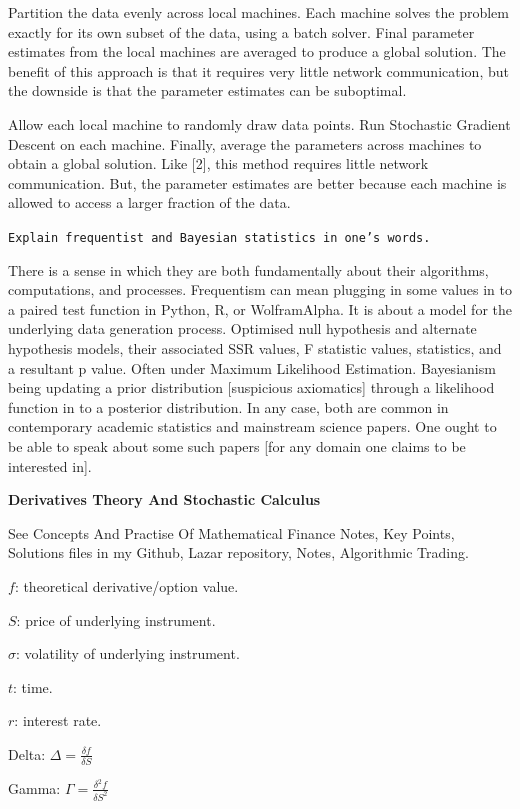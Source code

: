 Partition the data evenly across local machines. Each machine solves the problem exactly for its own subset of the data, using a batch solver. Final parameter estimates from the local machines are averaged to produce a global solution. The benefit of this approach is that it requires very little network communication, but the downside is that the parameter estimates can be suboptimal.

Allow each local machine to randomly draw data points. Run Stochastic Gradient Descent on each machine. Finally, average the parameters across machines to obtain a global solution. Like [2], this method requires little network communication. But, the parameter estimates are better because each machine is allowed to access a larger fraction of the data.

\texttt{Explain frequentist and Bayesian statistics in one's words.}

There is a sense in which they are both fundamentally about their algorithms, computations, and processes. Frequentism can mean plugging in some values in to a paired test function in Python, R, or WolframAlpha. It is about a model for the underlying data generation process. Optimised null hypothesis and alternate hypothesis models, their associated SSR values, F statistic values, statistics, and a resultant p value. Often under Maximum Likelihood Estimation. Bayesianism being updating a prior distribution [suspicious axiomatics] through a likelihood function in to a posterior distribution. In any case, both are common in contemporary academic statistics and mainstream science papers. One ought to be able to speak about some such papers [for any domain one claims to be interested in].

\newpage

\textbf{Derivatives Theory And Stochastic Calculus}

See Concepts And Practise Of Mathematical Finance Notes, Key Points, Solutions files in my Github, Lazar repository, Notes, Algorithmic Trading.

$f$: theoretical derivative/option value.

$S$: price of underlying instrument.

$\sigma$: volatility of underlying instrument.

$t$: time.

$r$: interest rate.

Delta: $\Delta = \frac{\delta f}{\delta S}$

Gamma: $\Gamma = \frac{\delta^2 f}{\delta S^2}$

